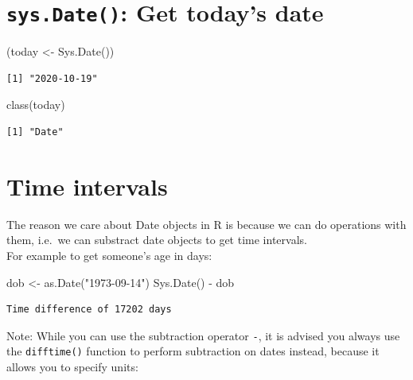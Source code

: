 \documentclass[
]{book}
\newenvironment{Shaded}{\begin{snugshade}}{\end{snugshade}}
\newcommand{\FunctionTok}[1]{\textcolor[rgb]{0.00,0.00,0.00}{#1}}
\newcommand{\NormalTok}[1]{#1}
\newcommand{\OtherTok}[1]{\textcolor[rgb]{0.56,0.35,0.01}{#1}}
\newcommand{\SpecialCharTok}[1]{\textcolor[rgb]{0.00,0.00,0.00}{#1}}
\newcommand{\StringTok}[1]{\textcolor[rgb]{0.31,0.60,0.02}{#1}}
\begin{document}
\hypertarget{sys.date-get-todays-date}{%
\section{\texorpdfstring{\texttt{sys.Date()}: Get today's date}{sys.Date(): Get today's date}}\label{sys.date-get-todays-date}}

\begin{Shaded}
\begin{Highlighting}[]
\NormalTok{(today }\OtherTok{\textless{}{-}} \FunctionTok{Sys.Date}\NormalTok{())}
\end{Highlighting}
\end{Shaded}

\begin{verbatim}
[1] "2020-10-19"
\end{verbatim}

\begin{Shaded}
\begin{Highlighting}[]
\FunctionTok{class}\NormalTok{(today)}
\end{Highlighting}
\end{Shaded}

\begin{verbatim}
[1] "Date"
\end{verbatim}

\hypertarget{time-intervals}{%
\section{Time intervals}\label{time-intervals}}

The reason we care about Date objects in R is because we can do operations with them, i.e.~we can substract date objects to get time intervals.\\
For example to get someone's age in days:

\begin{Shaded}
\begin{Highlighting}[]
\NormalTok{dob }\OtherTok{\textless{}{-}} \FunctionTok{as.Date}\NormalTok{(}\StringTok{"1973{-}09{-}14"}\NormalTok{)}
\FunctionTok{Sys.Date}\NormalTok{() }\SpecialCharTok{{-}}\NormalTok{ dob}
\end{Highlighting}
\end{Shaded}

\begin{verbatim}
Time difference of 17202 days
\end{verbatim}

Note: While you can use the subtraction operator \texttt{-}, it is advised you always use the \texttt{difftime()} function to perform subtraction on dates instead, because it allows you to specify units:
\end{document}
